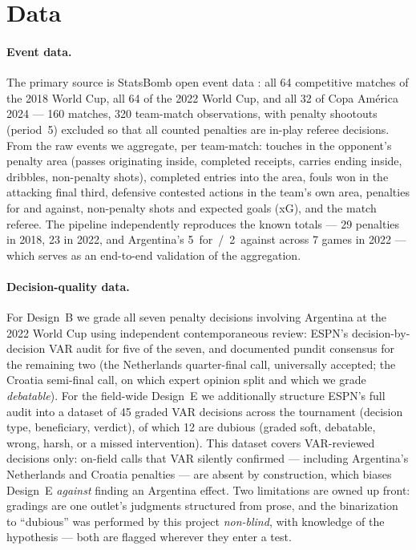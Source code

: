 \documentclass[11pt,a4paper]{article}
\begin{document}
\section{Data}
\label{sec:data}

\paragraph{Event data.} The primary source is StatsBomb open event data
\cite{statsbomb}: all 64
competitive matches of the 2018 World Cup, all 64 of the 2022 World Cup, and all 32
of Copa Am\'erica 2024 --- 160 matches, 320 team-match observations, with penalty
shootouts (period~5) excluded so that all counted penalties are in-play referee
decisions. From the raw events we aggregate, per team-match: touches in the
opponent's penalty area (passes originating inside, completed receipts, carries
ending inside, dribbles, non-penalty shots), completed entries into the area, fouls
won in the attacking final third, defensive contested actions in the team's own area,
penalties for and against, non-penalty shots and expected goals (xG), and the match
referee. The pipeline independently reproduces the known totals --- 29 penalties in
2018, 23 in 2022, and Argentina's 5~for~/~2~against across 7 games in 2022 --- which
serves as an end-to-end validation of the aggregation.

\paragraph{Decision-quality data.} For Design~B we grade all seven penalty decisions
involving Argentina at the 2022 World Cup using independent contemporaneous review:
ESPN's decision-by-decision VAR audit for five of the seven, and documented pundit
consensus for the remaining two (the Netherlands quarter-final call, universally
accepted; the Croatia semi-final call, on which expert opinion split and which we
grade \emph{debatable}). For the field-wide Design~E we additionally structure ESPN's
full audit into a dataset of 45 graded VAR decisions across the tournament (decision
type, beneficiary, verdict), of which 12 are dubious (graded soft, debatable, wrong,
harsh, or a missed intervention). This dataset covers VAR-reviewed decisions only:
on-field calls that VAR silently confirmed --- including Argentina's Netherlands and
Croatia penalties --- are absent by construction, which biases Design~E
\emph{against} finding an Argentina effect. Two limitations are owned up front:
gradings are one outlet's judgments structured from prose, and the binarization to
``dubious'' was performed by this project \emph{non-blind}, with knowledge of the
hypothesis --- both are flagged wherever they enter a test.
\end{document}
